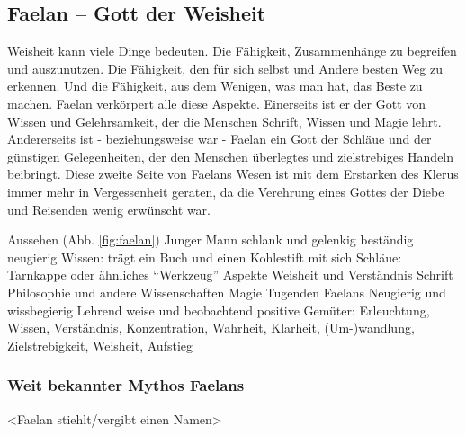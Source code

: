 \subsection{Faelan -- Gott der Weisheit}
Weisheit kann viele Dinge bedeuten. 
Die Fähigkeit, Zusammenhänge zu begreifen und auszunutzen. 
Die Fähigkeit, den für sich selbst und Andere besten Weg zu erkennen. 
Und die Fähigkeit, aus dem Wenigen, was man hat, das Beste zu machen. 
Faelan verkörpert alle diese Aspekte. 
Einerseits ist er der Gott von Wissen und Gelehrsamkeit, der die Menschen Schrift, Wissen und Magie lehrt. 
Andererseits ist - beziehungsweise war - Faelan ein Gott der Schläue und der günstigen Gelegenheiten, der den Menschen überlegtes und zielstrebiges Handeln beibringt. 
Diese zweite Seite von Faelans Wesen ist mit dem Erstarken des Klerus immer mehr in Vergessenheit geraten, da die Verehrung eines Gottes der Diebe und Reisenden wenig erwünscht war.
\begin{outline}
	\1 Aussehen (Abb. \ref{fig:faelan})
		\2 Junger Mann 
		\2 schlank und gelenkig
		\2 beständig neugierig
		\2 Wissen: trägt ein Buch und einen Kohlestift mit sich
		\2 Schläue: Tarnkappe oder ähnliches ``Werkzeug''
	\1 Aspekte
		\2 Weisheit und Verständnis
		\2 Schrift
		\2 Philosophie und andere Wissenschaften
		\2 Magie
	\1 Tugenden Faelans
		\2 Neugierig und wissbegierig
		\2 Lehrend
		\2 weise und beobachtend
	\1 positive Gemüter: Erleuchtung, Wissen, Verständnis, Konzentration, Wahrheit, Klarheit, (Um-)wandlung, Zielstrebigkeit, Weisheit, Aufstieg
\end{outline}
\subsubsection{Weit bekannter Mythos Faelans}
<Faelan stiehlt/vergibt einen Namen> 

